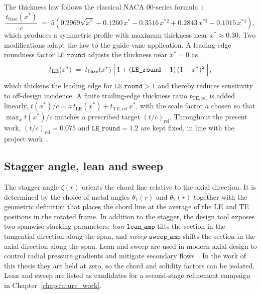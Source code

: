 The thickness law follows the classical NACA 00-series formula~\cite{Abbott1959}:
\begin{equation}
\frac{t_{\mathrm{base}}(x^*)}{c} \;=\; 5\!\left(0.2969\sqrt{x^*} - 0.1260\,x^* - 0.3516\,x^{*2} + 0.2843\,x^{*3} - 0.1015\,x^{*4}\right),
\label{eq:naca_thickness}
\end{equation}
which produces a symmetric profile with maximum thickness near $x^* \approx 0.30$. Two modifications adapt the law to the guide-vane application. A leading-edge roundness factor $\texttt{LE\_round}$ adjusts the thickness near $x^* = 0$ as
\begin{equation}
t_{\mathrm{LE}}(x^*) \;=\; t_{\mathrm{base}}(x^*)\,\Bigl[\,1 + (\texttt{LE\_round}-1)\,(1-x^*)^2\,\Bigr],
\label{eq:LE_round}
\end{equation}
which thickens the leading edge for $\texttt{LE\_round} > 1$ and thereby reduces sensitivity to off-design incidence. A finite trailing-edge thickness ratio $t_{\mathrm{TE,rel}}$ is added linearly, $t(x^*)/c = a\,t_{\mathrm{LE}}(x^*) + t_{\mathrm{TE,rel}}\,x^*$, with the scale factor $a$ chosen so that $\max_x t(x^*)/c$ matches a prescribed target $(t/c)_{\mathrm{rel}}$. Throughout the present work, $(t/c)_{\mathrm{rel}} = 0.075$ and $\texttt{LE\_round} = 1.2$ are kept fixed, in line with the project work~\cite{Leonsen2025}.
 
\subsection{Stagger angle, lean and sweep}
\label{sec:theory_stagger_lean_sweep}
 
The stagger angle $\zeta(r)$ orients the chord line relative to the axial direction. It is determined by the choice of metal angles $\theta_1(r)$ and $\theta_2(r)$ together with the geometric definition that places the chord line at the average of the LE and TE positions in the rotated frame. In addition to the stagger, the design tool exposes two spanwise stacking parameters: \emph{lean} $\texttt{lean\_amp}$ tilts the section in the tangential direction along the span, and \emph{sweep} $\texttt{sweep\_amp}$ shifts the section in the axial direction along the span. Lean and sweep are used in modern axial design to control radial pressure gradients and mitigate secondary flows~\cite{Schnoes2018}. In the work of this thesis they are held at zero, so the chord and solidity factors can be isolated. Lean and sweep are listed as candidates for a second-stage refinement campaign in Chapter~\ref{chap:future_work}.
 
